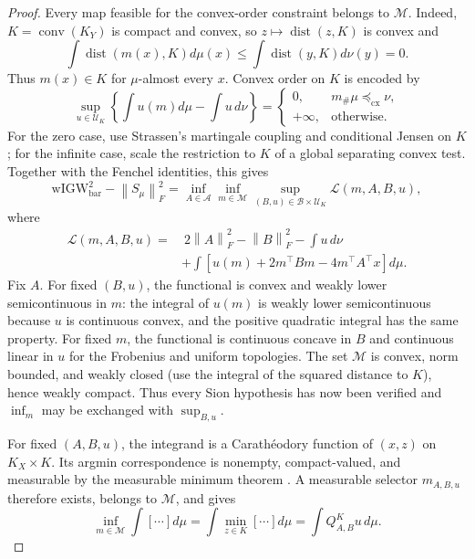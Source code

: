 \documentclass[11pt]{article}
\newcommand{\cU}{\mathcal U}
\newcommand{\cM}{\mathcal M}
\newcommand{\norm}[1]{\left\lVert #1\right\rVert}
\newcommand{\cx}{\preceq_{\mathrm{cx}}}
\newcommand{\wIGW}{\mathrm{wIGW}_{\mathrm{bar}}}
\theoremstyle{plain}
\theoremstyle{definition}
\theoremstyle{remark}
\begin{document}
\begin{proof}
Every map feasible for the convex-order constraint belongs to $\cM$. Indeed,
$K=\operatorname{conv}(K_Y)$ is compact and convex, so
$z\mapsto\operatorname{dist}(z,K)$ is convex and
\[
 \int\operatorname{dist}(m(x),K)d\mu(x)
 \le \int\operatorname{dist}(y,K)d\nu(y)=0.
\]
Thus $m(x)\in K$ for $\mu$-almost every $x$.
Convex order on \(K\) is encoded by
\[
  \sup_{u\in\cU_K}\left\{\int u(m)d\mu-\int u\,d\nu\right\}
  =\begin{cases}0,&m_\#\mu\cx\nu,\\+\infty,&\text{otherwise}.
  \end{cases}
\]
For the zero case, use Strassen's martingale coupling and conditional Jensen on
$K$; for the infinite case, scale the restriction to $K$ of a global separating
convex test.
Together with the Fenchel identities, this gives
\[
  \wIGW^2-\norm{S_\mu}_F^2
  =\inf_{A\in\mathcal A}\inf_{m\in\cM}
  \sup_{(B,u)\in\mathcal B\times\cU_K}\mathcal L(m,A,B,u),
\]
where
\[
\begin{aligned}
  \mathcal L(m,A,B,u)
  =&\ 2\norm{A}_F^2-\norm{B}_F^2-\int u\,d\nu\\
  &+\int[u(m)+2m^\top Bm-4m^\top A^\top x]d\mu.
\end{aligned}
\]
Fix \(A\). For fixed \((B,u)\), the functional is convex and weakly lower
semicontinuous in \(m\): the integral of $u(m)$ is weakly lower semicontinuous
because $u$ is continuous convex, and the positive quadratic integral has the same
property. For fixed \(m\), the functional is continuous concave in \(B\) and
continuous linear in \(u\) for the Frobenius and uniform topologies. The set
$\cM$ is convex, norm bounded, and weakly closed (use the integral of the squared
distance to $K$), hence weakly compact. Thus every Sion hypothesis \cite{Sion} has now been
verified and $\inf_m$ may be exchanged with $\sup_{B,u}$.

For fixed $(A,B,u)$, the integrand is a Carath\'eodory function of $(x,z)$ on
$K_X\times K$. Its argmin correspondence is nonempty, compact-valued, and
measurable by the measurable minimum theorem
\cite[Theorem~18.19]{AliprantisBorder}. A measurable selector $m_{A,B,u}$ therefore
exists, belongs to $\cM$,
and gives
\[
 \inf_{m\in\cM}\int[\cdots]d\mu
 =\int\min_{z\in K}[\cdots]d\mu
 =\int Q_{A,B}^{K}u\,d\mu.
\]
\end{proof}
\end{document}
